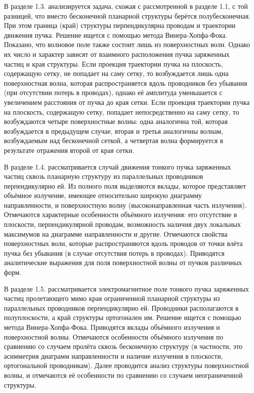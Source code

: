 В разделе 1.3. анализируется задача, схожая с рассмотренной в разделе 1.1, с той разницей, что вместо бесконечной планарной структуры берётся полубесконечная. При этом граница (край) структуры перпендикулярна проводам и траектории движения пучка. Решение ищется с помощью метода Винера-Хопфа-Фока. Показано, что волновое поле также состоит лишь из поверхностных волн. Однако их число и характер зависят от взаимного расположения пучка заряженных частиц и края структуры. Если проекция траектории пучка на плоскость, содержащую сетку, не попадает на саму сетку, то возбуждается лишь одна поверхностная волна, которая распространяется вдоль проводников без убывания (при отсутствии потерь в проводах), однако её амплитуда уменьшается с увеличением расстояния от пучка до края сетки. Если проекция траектории пучка на плоскость, содержащую сетку, попадает непосредственно на саму сетку, то возбуждаются четыре поверхностные волны: одна аналогична той, которая возбуждается в предыдущем случае, вторая и третья аналогичны волнам, возбуждаемым над бесконечной сеткой, а четвертая волна формируется в результате отражения второй от края сетки.

В разделе 1.4. рассматривается случай движения тонкого пучка заряженных частиц сквозь планарную структуру из параллельных проводников перпендикулярно ей. Из полного поля выделяются вклады, которое представляет объёмное излучение, имеющее относительно широкую диаграмму направленности, и поверхностную волну (высоконаправленная часть излучения). Отмечаются характерные особенности объёмного излучения: его отсутствие в плоскости, перпендикулярной проводам, возможность наличия двух локальных максимумов на диаграмме направленности и другие. Отмечаются свойства поверхностных волн, которые распространяются вдоль проводов от точки влёта пучка без убывания (в случае отсутствия потерь в проводах). Приводятся аналитические выражения для поля поверхностной волны от пучков различных форм.

В разделе 1.5. рассматривается электромагнитное поле тонкого пучка заряженных частиц пролетающего мимо края ограниченной планарной структуры из параллельных проводников перпендикулярно ей. Проводники располагаются в полуплоскости, а край структуры ортогонален им. Решение ищется с помощью метода Винера-Хопфа-Фока. Приводятся вклады объёмного излучения и поверхностной волны. Отмечаются особенности объёмного излучения по сравнению со случаем пролёта сквозь бесконечную структуру (в частности, это асимметрия диаграмм направленности и наличие излучения в плоскости, ортогональной проводникам). Далее проводится анализ структуры поверхностной волны, и отмечаются её особенности по сравнению со случаем неограниченной структуры.

